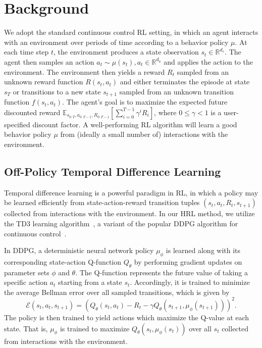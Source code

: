 \documentclass{article}
\begin{document}
\section{Background}
We adopt the standard continuous control RL setting, in which an agent interacts with an environment over periods of time according to a behavior policy $\mu$.  At each time step $t$, the environment produces a state observation $s_t\in\mathbb{R}^{d_s}$.%
The agent then samples an action $a_t\sim\mu(s_t),a_t\in\mathbb{R}^{d_a}$%
and applies the action to the environment.  
The environment then yields a reward $R_t$ sampled from an unknown reward function $R(s_t, a_t)$
and either terminates the episode at state $s_T$ or transitions to a new state $s_{t+1}$ sampled from an unknown transition function $f(s_t, a_t)$.
The agent's goal is to maximize the expected future discounted reward %
$\mathbb{E}_{s_{0:T}, a_{0:T-1}, R_{0:T-1}}\left[\textstyle\sum_{i=0}^{T-1} \gamma^i R_i\right]$,
where $0\le\gamma<1$ is a user-specified discount factor.
A well-performing RL algorithm will learn a good behavior policy $\mu$ from (ideally a small number of) interactions with the environment.  

\subsection{Off-Policy Temporal Difference Learning}

Temporal difference learning is a powerful paradigm in RL, in which a policy may be learned efficiently from state-action-reward transition tuples $(s_t, a_t, R_t, s_{t+1})$ collected from interactions with the environment.  In our HRL method, we utilize the TD3 learning algorithm~\cite{td3}, a variant of the popular DDPG algorithm for continuous control~\cite{ddpg}.

In DDPG, a deterministic neural network policy $\mu_\phi$ is learned along with its corresponding state-action Q-function $Q_\theta$ by performing gradient updates on parameter sets $\phi$ and $\theta$.  The Q-function represents the future value of taking a specific action $a_t$ starting from a state $s_t$.  Accordingly, it is trained to minimize the average Bellman error over all sampled transitions, which is given by
\begin{equation}
\mathcal E(s_t, a_t, s_{t+1}) = (Q_\theta(s_t, a_t) - R_t - \gamma Q_\theta(s_{t+1}, \mu_\phi(s_{t+1})))^2.
\label{eq:bellman}
\end{equation}
The policy is then trained to yield actions which maximize the Q-value at each state.  That is, $\mu_\phi$ is trained to maximize $Q_\theta(s_t, \mu_\phi(s_t))$ over all $s_t$ collected from interactions with the environment.
\end{document}
